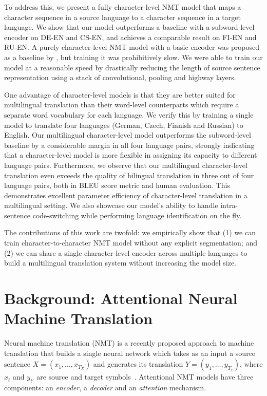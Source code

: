 \documentclass[11pt,letterpaper]{article}
\newcommand{\ti}{\textit}
\newcommand{\nrr}{\color{black}}
\begin{document}
To address this, we present a fully character-level NMT model that maps a character sequence in a source language to a character sequence in a target language. We show that our model outperforms a baseline with a subword-level encoder on DE-EN and CS-EN, and achieves a comparable result on FI-EN and RU-EN. {\nrr A purely character-level NMT model with a basic encoder was proposed as a baseline by , but training it was prohibitively slow.} We were able to train our model at a reasonable speed by drastically reducing the length of source sentence representation using a stack of convolutional, pooling and highway layers.

One advantage of character-level models is that they are better suited for multilingual translation than their word-level counterparts which require a separate word vocabulary for each language. We verify this by training a single model to translate four languages (German, Czech, Finnish and Russian) to English. Our multilingual character-level model outperforms the subword-level baseline by a considerable margin in all four language pairs, strongly indicating that a character-level model is more flexible in assigning its capacity to different language pairs. Furthermore, we observe {\nrr that} our multilingual character-level translation even exceeds the quality of bilingual translation in three out of four language pairs, both in BLEU score metric and human evaluation. This demonstrates excellent parameter efficiency of character-level translation in a multilingual setting. We also showcase our model's ability to handle intra-sentence code-switching while performing language identification on the fly.

The contributions of this work are twofold: we empirically show that (1) we can train character-to-character NMT model without any explicit segmentation; and (2) we can share a single character-level encoder across multiple languages to build a multilingual translation system without increasing the model size.


\section{Background: Attentional Neural Machine Translation}\label{sec:back}

Neural machine translation (NMT) is a recently proposed approach to machine translation that builds a single neural network which takes as an input a source sentence $X = (x_1, \ldots, x_{T_X})$ and generates its translation $Y = (y_1, \ldots, y_{T_Y})$, where $x_t$ and $y_{t'}$ are source and target symbols~\cite{Bahdanau:15,Sutskever:14,Luong:15,Cho:14a}. Attentional NMT models have three components: an \ti{encoder}, a \ti{decoder} and an \ti{attention} mechanism. \\
\end{document}
